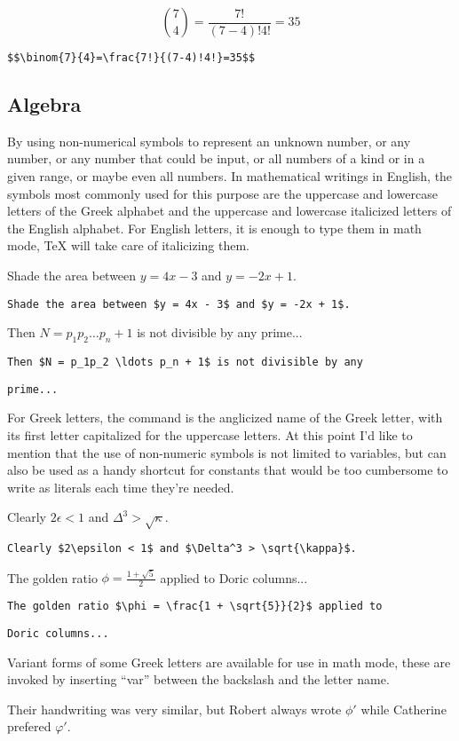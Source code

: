 $$\binom{7}{4}=\frac{7!}{(7-4)!4!}=35$$

\verb'$$\binom{7}{4}=\frac{7!}{(7-4)!4!}=35$$'

\subsection*{Algebra}

By using non-numerical symbols to represent an unknown number, or any number, or any number that could be input, or all numbers of a kind or in a given range, or maybe even all numbers. In mathematical writings in English, the symbols most commonly used for this purpose are the uppercase and lowercase letters of the Greek alphabet and the uppercase and lowercase italicized letters of the English alphabet. For English letters, it is enough to type them in math mode, \TeX{} will take care of italicizing them.

Shade the area between $y = 4x - 3$ and $y = -2x + 1$.

\verb'Shade the area between $y = 4x - 3$ and $y = -2x + 1$.'

Then $N = p_1p_2 \ldots p_n + 1$ is not divisible by any prime...

\verb'Then $N = p_1p_2 \ldots p_n + 1$ is not divisible by any'

\verb'prime...'

For Greek letters, the command is the anglicized name of the Greek letter, with its first letter capitalized for the uppercase letters. At this point I'd like to mention that the use of non-numeric symbols is not limited to variables, but can also be used as a handy shortcut for constants that would be too cumbersome to write as literals each time they're needed.

Clearly $2\epsilon < 1$ and $\Delta^3 > \sqrt\kappa$.

\verb'Clearly $2\epsilon < 1$ and $\Delta^3 > \sqrt{\kappa}$.'

The golden ratio $\phi = \frac{1 + \sqrt{5}}{2}$ applied to Doric columns...

\verb'The golden ratio $\phi = \frac{1 + \sqrt{5}}{2}$ applied to'

\verb'Doric columns...'

Variant forms of some Greek letters are available for use in math mode, these are invoked by inserting ``var'' between the backslash and the letter name.

Their handwriting was very similar, but Robert always wrote $\phi\prime$ while Catherine prefered $\varphi\prime$.


